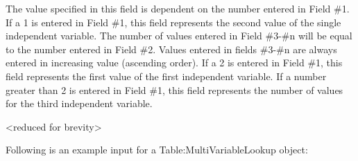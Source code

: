 The value specified in this field is dependent on the number entered in Field \#1. If a 1 is entered in Field \#1, this field represents the second value of the single independent variable. The number of values entered in Field \#3-\#n will be equal to the number entered in Field \#2. Values entered in fields \#3-\#n are always entered in increasing value (ascending order). If a 2 is entered in Field \#1, this field represents the first value of the first independent variable. If a number greater than 2 is entered in Field \#1, this field represents the number of values for the third independent variable.

\textless{}reduced for brevity\textgreater{}

Following is an example input for a Table:MultiVariableLookup object:

\begin{lstlisting}


\end{lstlisting}
